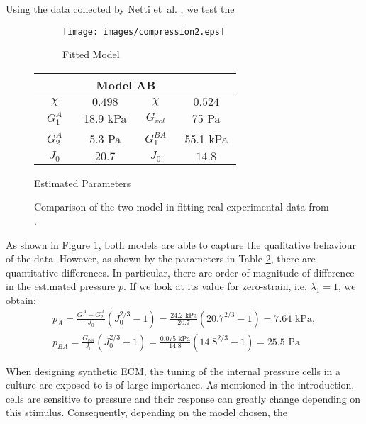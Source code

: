Using the data collected by Netti et~al. \cite{Netti}, we test the 
\begin{figure}[h]
	\hspace{-8mm}
	\begin{subfigure}{0.62\textwidth}
		\hspace{2mm}
		\texttt{[image: images/compression2.eps]}
		\caption{Fitted Model}
		\label{fit}
	\end{subfigure}
	\begin{subtable}{0.375\textwidth}
			\begin{tabular}{c | c ||c| c }		
				\hline\addlinespace[2pt]
				 \multicolumn{2}{c||}{Model A} &  \multicolumn{2}{c}{Model AB}\\[0.5mm]
				\hline\addlinespace[2pt]
				$\quad \chi\quad$ & $\quad0.498\quad$ &$\quad \chi\quad$&$\quad0.524\quad$\\[0.5mm]
				$G^A_1$ & 18.9 kPa&$G_{vol}$&75 Pa\\[0.5mm]
				$G^A_2$ & 5.3 Pa&$G^{BA}_{1}$& 55.1 kPa\\[0.5mm]
				$J_0$ & $20.7$&  $J_0$&$14.8$\\[0.5mm]
				\hline
			\end{tabular}
		\caption{Estimated Parameters}
		\label{param}
	\end{subtable}
\caption{Comparison of the two model in fitting real experimental data from \cite{Netti}.}		
\end{figure}

As shown in Figure \ref{fit}, both models are able to capture the qualitative behaviour of the data. However, as shown by the parameters in Table \ref{param}, there are quantitative differences. In particular, there are order of magnitude of difference in the estimated pressure $p$. If we look at its value for zero-strain, i.e. $\lambda_1=1$, we obtain: 
\begin{gather}
p_A = \frac{G^A_1+G^A_2}{J_0}(J_0^{2/3}-1) = \frac{24.2 \text{ kPa}}{20.7}(20.7^{2/3}-1) = 7.64 \text{ kPa},\\
p_{BA} = \frac{G_{vol}}{J_0}(J_0^{2/3}-1) = \frac{0.075 \text{ kPa}}{14.8}(14.8^{2/3}-1) = 25.5 \text{ Pa}
\end{gather}

When designing synthetic ECM, the tuning of the internal pressure cells in a culture are exposed to is of large importance. As mentioned in the introduction, cells are sensitive to pressure and their response can greatly change depending on this stimulus. Consequently, depending on the model chosen, the
